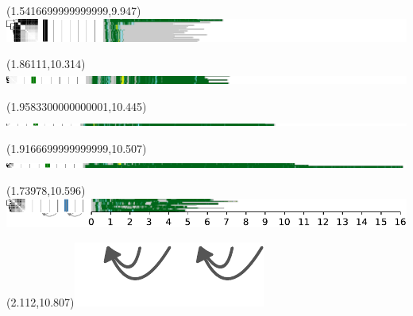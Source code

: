 \documentclass{article}
\begin{document}
\begin{textblock}{13}(1.5416699999999999,9.947)\includegraphics{./Figure_S5/chr15-HG001.pdf}\end{textblock}
\begin{textblock}{13}(1.86111,10.314)\includegraphics{./Figure_S5/chr15-HG002.pdf}\end{textblock}
\begin{textblock}{13}(1.9583300000000001,10.445)\includegraphics{./Figure_S5/chr15-HG003.pdf}\end{textblock}
\begin{textblock}{13}(1.9166699999999999,10.507)\includegraphics{./Figure_S5/chr15-HG004.pdf}\end{textblock}
\begin{textblock}{13}(1.73978,10.596)\includegraphics{./Figure_S5/chr15-HG005.pdf}\end{textblock}
\begin{textblock}{13}(2.112,10.807)\includegraphics[width=.755in,keepaspectratio]{Figure_4/fatter-arrows.pdf}\end{textblock}
\end{document}
